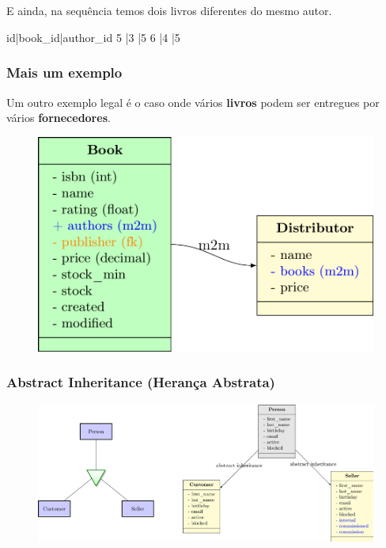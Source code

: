 \documentclass[aspectratio=169]{beamer}
\begin{document}
{\begin{frame}[fragile]
\

\


E ainda, na sequência temos dois livros diferentes do mesmo autor.

\begin{bashcode}
id|book_id|author_id
5 |3	  	  |5
6 |4	  	  |5
\end{bashcode}

\end{frame}

\begin{frame}\frametitle{Mais um exemplo}	
Um outro exemplo legal é o caso onde vários \textbf{livros} podem ser entregues por vários \textbf{fornecedores}.

	\begin{figure}[h]
	  \centering
  		\includegraphics[height=.7\paperheight]{img/04m2m}
	\end{figure}

\end{frame}


\begin{frame}\frametitle{Abstract Inheritance (Herança Abstrata)}




    \begin{figure}[h]
      \centering
        \includegraphics[width=.93\paperwidth]{img/05abstract}
    \end{figure}


\end{frame}}
\end{document}
